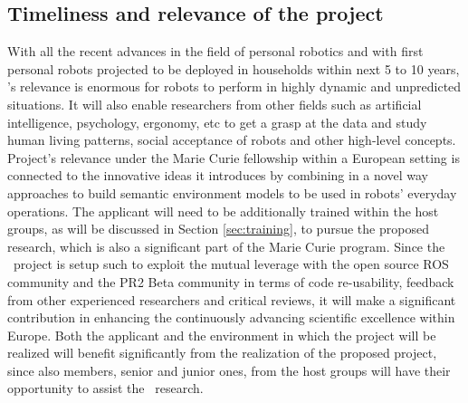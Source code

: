 \subsection{Timeliness and relevance of the project}
With all the recent advances in the field of personal robotics and with first
personal robots projected to be deployed in households within next 5 to 10 years, 
\ksem's relevance is enormous for robots to perform in highly dynamic and unpredicted
situations. It will also enable researchers from other fields such as artificial intelligence, 
psychology, ergonomy, etc to get a grasp at the data and study human living patterns, 
social acceptance of robots and other high-level concepts.
Project's relevance under the Marie Curie fellowship within a European 
setting is connected to the innovative ideas it introduces by combining in a novel way 
approaches to build semantic environment models to be used in robots' everyday operations.
The applicant will need to be additionally trained within the host groups, as will be discussed in Section 
\ref{sec:training}, to pursue the proposed research, which is also a significant part of the Marie Curie program.
Since the \ksem\ project is setup such to exploit the mutual leverage with the open source ROS 
community and the PR2 Beta community 
in terms of code re-usability, feedback from other experienced researchers and critical reviews, 
it will make a significant contribution in enhancing the continuously advancing scientific excellence within Europe. 
Both the applicant and the  environment in which the project will be realized will benefit significantly from the 
realization of the proposed project, since also members, senior and junior ones, from the 
host groups will have their opportunity to assist the \ksem\ research. \\

